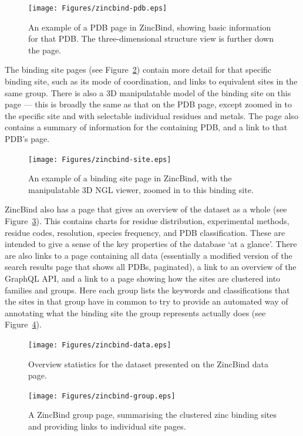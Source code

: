 \begin{figure}
\centering
\texttt{[image: Figures/zincbind-pdb.eps]}
\caption{\label{fig:zincbind-pdb} An example of a PDB page in ZincBind, showing basic
information for that PDB. The three-dimensional structure view is further down the page.}
\end{figure}

The binding site pages (see Figure~\ref{fig:zincbind-site}) contain more detail for that specific binding site, such as its mode of coordination, and links to equivalent sites in the same group. There is also a 3D manipulatable model of the binding site on this page --- this is broadly the same as that on the PDB page, except zoomed in to the specific site and with selectable individual residues and metals. The page also contains a summary of information for the containing PDB, and a link to that PDB's page.

\begin{figure}
\centering
\texttt{[image: Figures/zincbind-site.eps]}
\caption[An example of a binding site page in ZincBind.]{\label{fig:zincbind-site} An example of a binding site page in ZincBind, with the manipulatable
3D NGL viewer, zoomed in to this binding site.}
\end{figure}

ZincBind also has a page that gives an overview of the dataset as a whole (see Figure~\ref{fig:zincbind-data}). This contains charts for residue distribution, experimental methods, residue codes, resolution, species frequency, and PDB classification. These are intended to give a sense of the key properties of the database `at a glance'. There are also links to a page containing all data (essentially a modified version of the search results page that shows all PDBs, paginated), a link to an overview of the GraphQL API, and a link to a page showing how the sites are clustered into families and groups. Here each group lists the keywords and classifications that the sites in that group have in common to try to provide an automated way of annotating what the binding site the group represents actually does (see Figure~\ref{fig:zincbind-group}).

\begin{figure}
\centering
\texttt{[image: Figures/zincbind-data.eps]}
\caption{\label{fig:zincbind-data} Overview statistics for the dataset presented on
the ZincBind data page.}
\end{figure}

\begin{figure}
\centering
\texttt{[image: Figures/zincbind-group.eps]}
\caption{\label{fig:zincbind-group} A ZincBind group page, summarising the clustered zinc
binding sites and providing links to individual site pages.}
\end{figure}

